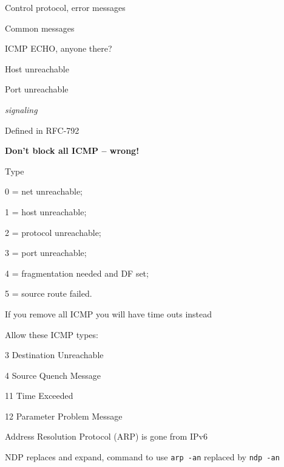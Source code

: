 \documentclass[Screen16to9,17pt]{foils}
\begin{document}

\begin{list1}
\item Control protocol, error messages
\item Common messages
\begin{list2}
\item ICMP ECHO, anyone there?
\item Host unreachable
\item Port unreachable
\end{list2}
\item \emph{signaling}
\item Defined in RFC-792
\end{list1}

\centerline{\bf Don't block all ICMP -- wrong!}


\begin{list1}
\item Type
\begin{list2}
\item 0 = net unreachable;
\item 1 = host unreachable;
\item 2 = protocol unreachable;
\item 3 = port unreachable;
\item 4 = fragmentation needed and DF set;
\item 5 = source route failed.
\end{list2}
\item If you remove all ICMP you will have time outs instead
\item Allow these ICMP types:
\begin{list2}
\item 3 Destination Unreachable
\item 4 Source Quench Message
\item 11 Time Exceeded
\item 12 Parameter Problem Message
\end{list2}
\end{list1}




\begin{list1}
\item Address Resolution Protocol (ARP) is gone from IPv6
\item NDP replaces and expand, command to use \verb+arp -an+ replaced by \verb+ndp -an+
\end{list1}
\end{document}
